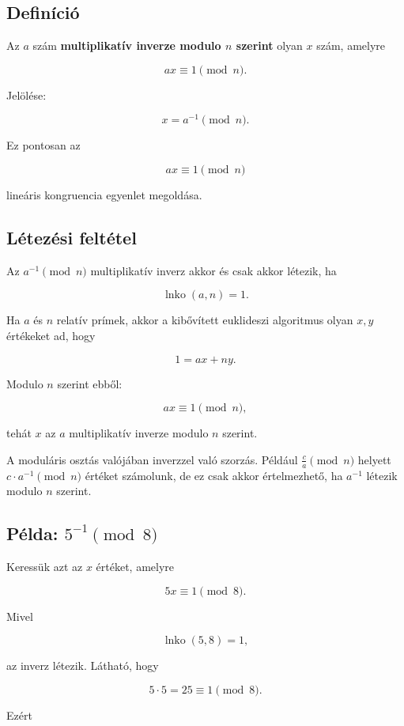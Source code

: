 \subsection{Definíció}

Az $a$ szám \textbf{multiplikatív inverze modulo $n$ szerint} olyan $x$ szám, amelyre

\[
a x\equiv1\pmod n.
\]

Jelölése:

\[
x=a^{-1}\pmod n.
\]

Ez pontosan az

\[
ax\equiv1\pmod n
\]

lineáris kongruencia egyenlet megoldása.

\subsection{Létezési feltétel}

Az $a^{-1}\pmod n$ multiplikatív inverz akkor és csak akkor létezik, ha

\[
\operatorname{lnko}(a,n)=1.
\]

Ha $a$ és $n$ relatív prímek, akkor a kibővített euklideszi algoritmus olyan $x,y$ értékeket ad, hogy

\[
1=ax+ny.
\]

Modulo $n$ szerint ebből:

\[
ax\equiv1\pmod n,
\]

tehát $x$ az $a$ multiplikatív inverze modulo $n$ szerint.

\begin{warningbox}
A moduláris osztás valójában inverzzel való szorzás. Például $\frac{c}{a}\pmod n$ helyett $c\cdot a^{-1}\pmod n$ értéket számolunk, de ez csak akkor értelmezhető, ha $a^{-1}$ létezik modulo $n$ szerint.
\end{warningbox}

\subsection{Példa: $5^{-1}\pmod8$}

Keressük azt az $x$ értéket, amelyre

\[
5x\equiv1\pmod8.
\]

Mivel

\[
\operatorname{lnko}(5,8)=1,
\]

az inverz létezik. Látható, hogy

\[
5\cdot5=25\equiv1\pmod8.
\]

Ezért

